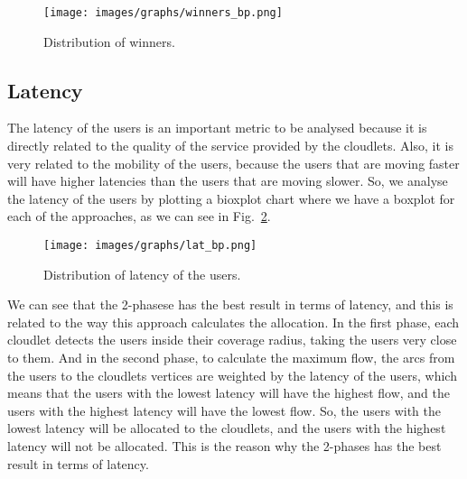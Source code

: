 \documentclass[English]{ic-tese-v3}
\begin{document}
\begin{figure}
    \centering
    \texttt{[image: images/graphs/winners\_bp.png]}
    \caption{Distribution of winners.}
    \label{fig:winners_dist}
\end{figure}

\subsection{Latency}
The latency of the users is an important metric to be analysed because it is directly related to the quality of the service provided by the cloudlets. Also, it is very related to the mobility of the users, because the users that are moving faster will have higher latencies than the users that are moving slower. So, we analyse the latency of the users by plotting a bioxplot chart where we have a boxplot for each of the approaches, as we can see in Fig.~\ref{fig:lat}.
\begin{figure}
    \centering
    \texttt{[image: images/graphs/lat\_bp.png]}
    \caption{Distribution of latency of the users.}
    \label{fig:lat}
\end{figure}

We can see that the 2-phasese has the best result in terms of latency, and this is related to the way this approach calculates the allocation. In the first phase, each cloudlet detects the users inside their coverage radius, taking the users very close to them. And in the second phase, to calculate the maximum flow, the arcs from the users to the cloudlets vertices are weighted by the latency of the users, which means that the users with the lowest latency will have the highest flow, and the users with the highest latency will have the lowest flow. So, the users with the lowest latency will be allocated to the cloudlets, and the users with the highest latency will not be allocated. This is the reason why the 2-phases has the best result in terms of latency.
\end{document}
